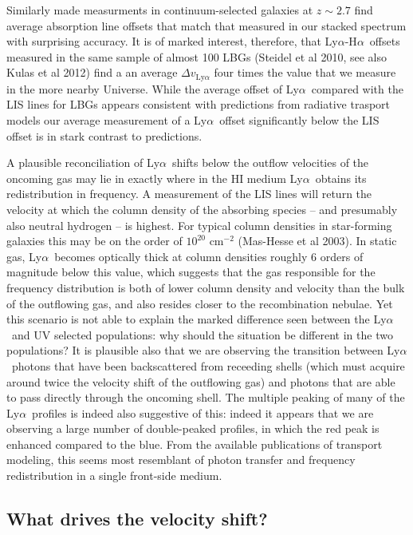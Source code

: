 \documentclass[manuscript]{emulateapj}
\newcommand{\lya}{Ly$\alpha$}
\newcommand{\ha}{H$\alpha$}
\begin{document}
Similarly made measurments in continuum-selected galaxies at $z\sim 2.7$
find average absorption line offsets that match that measured in
our stacked spectrum with surprising accuracy. It is of marked interest, 
therefore, that \lya-\ha\ offsets measured in the same sample of almost 100
LBGs (Steidel et al 2010, see also Kulas et al 2012) find a an average 
$\Delta v_{\mathrm{Ly}\alpha}$ four times the value that we measure in the 
more nearby Universe. While
the average offset of \lya\ compared with the LIS lines for LBGs appears 
consistent with predictions from radiative trasport models our average 
measurement of a \lya\ offset significantly below the LIS offset is in stark
contrast to predictions. 

A plausible reconciliation of \lya\ shifts below the outflow 
velocities of the oncoming gas may lie in exactly where in the HI medium
\lya\ obtains its redistribution in frequency.
A measurement of the LIS lines will return the velocity at which the column 
density of the absorbing species -- and presumably also neutral hydrogen -- 
is highest. For typical column densities in star-forming galaxies this may 
be on the order of $10^{20}$ cm$^{-2}$ (Mas-Hesse et al 2003). In static 
gas, \lya\ becomes optically
thick at column densities roughly 6 orders of magnitude below this value, which 
suggests that the gas responsible for the frequency distribution is both of lower
column density and velocity than the bulk of the outflowing gas, and also resides 
closer to the recombination nebulae. Yet this scenario is not able to explain
the marked difference seen between the \lya\ and UV selected populations: why
should the situation be different in the two populations? It is plausible also 
that we are observing the transition between \lya\ photons that have been 
backscattered from receeding shells (which must acquire around twice the
velocity shift of the outflowing gas) and photons that are able to pass directly
through the oncoming shell. The multiple peaking of many of the \lya\ profiles 
is indeed also suggestive of this: indeed it appears that we are observing 
a large number of double-peaked profiles, in which the red peak is enhanced 
compared to the blue. From the available publications of transport modeling, 
this seems most resemblant of photon transfer and frequency redistribution
in a single front-side medium. 

\subsection{What drives the velocity shift?} 
\end{document}
